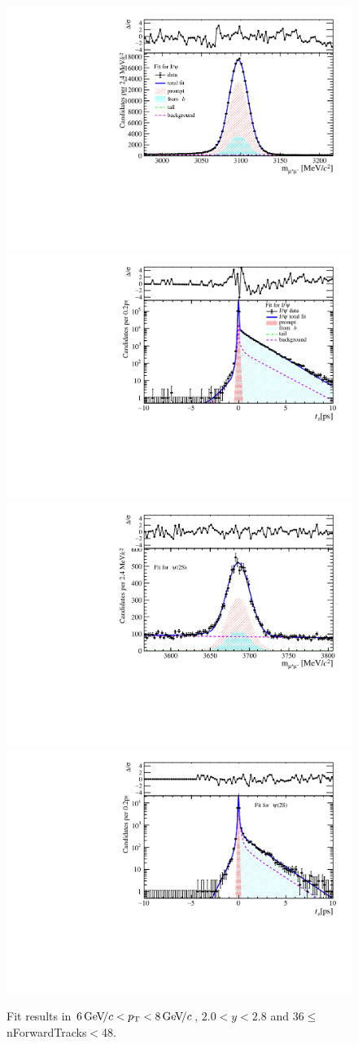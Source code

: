 \begin{figure}[H]
\begin{center}
\includegraphics[width=0.47\linewidth]{pdf/Jpsi/drawmassF/n4y1pt4.pdf}
\includegraphics[width=0.47\linewidth]{pdf/Jpsi/2DFitF/n4y1pt4.pdf}
\vspace*{-0.5cm}
\includegraphics[width=0.47\linewidth]{pdf/Psi2S/drawmassF/n4y1pt4.pdf}
\includegraphics[width=0.47\linewidth]{pdf/Psi2S/2DFitF/n4y1pt4.pdf}
\vspace*{-0.5cm}
\end{center}
\caption{Fit results in $6\text{\,Ge\kern -0.1em V\!/}c<p_{\mathrm{T}}<8\text{\,Ge\kern -0.1em V\!/}c$, $2.0<y<2.8$ and 36$\leq$nForwardTracks$<$48.}
\label{Fitn4y1pt4}
\end{figure}

